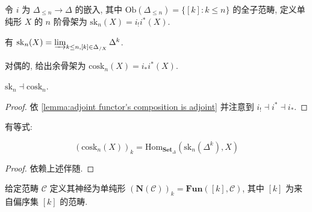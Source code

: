 \begin{definition}[骨架]
    令 \(i\) 为 \(\Delta_{\leq n} \to \Delta\) 的嵌入, 其中 \(\mathrm{Ob} (\Delta_{\leq n}) = \{[k] : k \leq n\}\) 的全子范畴, 定义单纯形 \(X\) 的 \(n\) 阶骨架为 \(\mathrm{sk}_n (X) = i_{!} i^\ast (X)\).
\end{definition}

\begin{corollary}
    有 \(\mathrm{sk}_n (X) = \varinjlim_{k \leq n,[k] \in \Delta_{/X}} \Delta^k\).
\end{corollary}

\begin{definition}
    对偶的, 给出余骨架为 \(\mathrm{cosk}_n (X) = i_\ast i^\ast (X)\).
\end{definition}

\begin{lemma}
    \(\mathrm{sk}_n \dashv \mathrm{cosk}_n\).

    \begin{proof}
        依 \ref{lemma:adjoint functor's composition is adjoint} 并注意到 \(i_{!} \dashv i^\ast \dashv i_\ast\).
    \end{proof}
\end{lemma}

\begin{lemma}
    有等式:

    \[
        {(\mathrm{cosk}_n (X))}_k = \mathrm{Hom}_{\mathbf{Set}_{\Delta}} (\mathrm{sk}_n (\Delta^k),X)
    \]

    \begin{proof}
        依赖上述伴随.
    \end{proof}
\end{lemma}

\begin{definition}[神经]
    \label {definition:nerve of a category}
    给定范畴 \(\mathcal{C}\) 定义其神经为单纯形 \({(\mathbf{N} (\mathcal{C}))}_k = \mathbf{Fun} ([k],\mathcal{C})\),
    其中 \([k]\) 为来自偏序集 \([k]\) 的范畴.
\end{definition}


